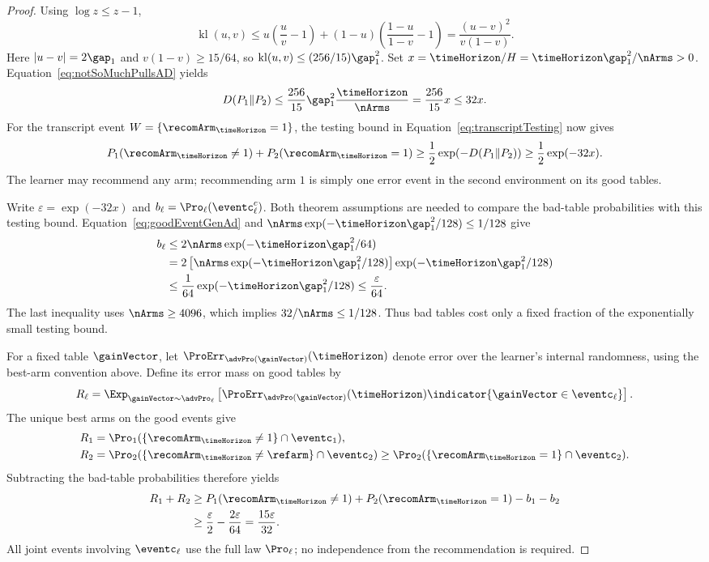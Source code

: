 \begin{proof}
Using $\log z\leq z-1$,
\[
\operatorname{kl}(u,v)
\leq u\left(\frac{u}{v}-1\right)
+(1-u)\left(\frac{1-u}{1-v}-1\right)
=\frac{(u-v)^2}{v(1-v)}.
\]
Here $|u-v|=2\gap_1$ and $v(1-v)\geq15/64$, so
$\operatorname{kl}(u,v)\leq(256/15)\gap_1^2$.
Set $x=\timeHorizon/H=\timeHorizon\gap_1^2/\nArms>0$.
Equation~\ref{eq:notSoMuchPullsAD} yields
\begin{equation}\label{eq:transcriptKLGenAd}
D(P_1\Vert P_2)
\leq\frac{256}{15}\gap_1^2\frac{\timeHorizon}{\nArms}
=\frac{256}{15}x\leq32x.
\end{equation}
For the transcript event $W=\{\recomArm_{\timeHorizon}=1\}$,
the testing bound in Equation~\ref{eq:transcriptTesting} now gives
\[
P_1(\recomArm_{\timeHorizon}\neq1)+P_2(\recomArm_{\timeHorizon}=1)
\geq\frac12\exp(-D(P_1\Vert P_2))\geq\frac12\exp(-32x).
\]
The learner may recommend any arm; recommending arm $1$ is simply
one error event in the second environment on its good tables.

Write $\varepsilon=\exp(-32x)$ and
$b_\ell=\Pro_\ell(\eventc_\ell^c)$.
Both theorem assumptions are needed to compare the bad-table
probabilities with this testing bound. Equation~\ref{eq:goodEventGenAd}
and $\nArms\exp(-\timeHorizon\gap_1^2/128)\leq1/128$ give
\begin{align*}
b_\ell
&\leq2\nArms\exp(-\timeHorizon\gap_1^2/64)\\
&=2\left[\nArms\exp(-\timeHorizon\gap_1^2/128)\right]
\exp(-\timeHorizon\gap_1^2/128)\\
&\leq\frac1{64}\exp(-\timeHorizon\gap_1^2/128)
\leq\frac{\varepsilon}{64}.
\end{align*}
The last inequality uses $\nArms\geq4096$, which implies
$32/\nArms\leq1/128$. Thus bad tables cost only a fixed fraction
of the exponentially small testing bound.

For a fixed table $\gainVector$, let
$\ProErr_{\advPro(\gainVector)}(\timeHorizon)$ denote error over the
learner's internal randomness, using the best-arm convention above.
Define its error mass on good tables by
\[
R_\ell=\Exp_{\gainVector\sim\advPro_\ell}
\left[\ProErr_{\advPro(\gainVector)}(\timeHorizon)
\indicator{\gainVector\in\eventc_\ell}\right].
\]
The unique best arms on the good events give
\begin{align*}
R_1&=\Pro_1(\{\recomArm_{\timeHorizon}\neq1\}\cap\eventc_1),\\
R_2&=\Pro_2(\{\recomArm_{\timeHorizon}\neq\refarm\}\cap\eventc_2)
\geq\Pro_2(\{\recomArm_{\timeHorizon}=1\}\cap\eventc_2).
\end{align*}
Subtracting the bad-table probabilities therefore yields
\begin{equation}\label{eq:goodErrorGenAd}
\begin{aligned}
R_1+R_2
&\geq P_1(\recomArm_{\timeHorizon}\neq1)
+P_2(\recomArm_{\timeHorizon}=1)-b_1-b_2\\
&\geq\frac{\varepsilon}{2}-\frac{2\varepsilon}{64}
=\frac{15\varepsilon}{32}.
\end{aligned}
\end{equation}
All joint events involving $\eventc_\ell$ use the full law $\Pro_\ell$;
no independence from the recommendation is required.


\end{proof}
